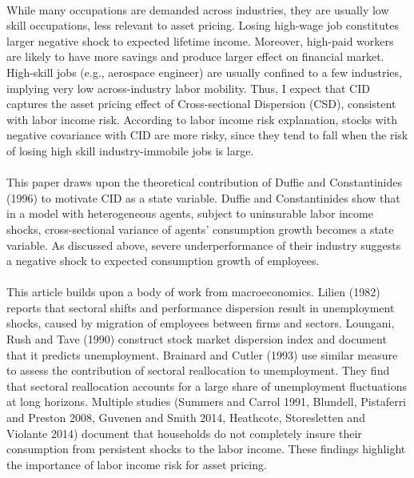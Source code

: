 \documentclass[12pt]{article}
\begin{document}
\paragraph{}
While many occupations are demanded across industries, they are usually low skill occupations, less relevant to asset pricing. Losing high-wage job constitutes larger negative shock to expected lifetime income. Moreover, high-paid workers are likely to have more savings and produce larger effect on financial market. High-skill jobs (e.g., aerospace engineer) are usually confined to a few industries, implying very low across-industry labor mobility. Thus, I expect that CID captures the asset pricing effect of Cross-sectional Dispersion (CSD), consistent with labor income risk. According to labor income risk explanation, stocks with negative covariance with CID are more risky, since they tend to fall when the risk of losing high skill industry-immobile jobs is large.
\paragraph{}
This paper draws upon the theoretical contribution of Duffie and Constantinides (1996) to motivate CID as a state variable. Duffie and Constantinides show that in a model with heterogeneous agents, subject to uninsurable labor income shocks, cross-sectional variance of agents' consumption growth becomes a state variable. As discussed above, severe underperformance of their industry suggests a negative shock to expected consumption growth of employees.
\paragraph{}
This article builds upon a body of work from macroeconomics. Lilien (1982) reports that sectoral shifts and performance dispersion result in unemployment shocks, caused by migration of employees between firms and sectors. Loungani, Rush and Tave (1990) construct stock market dispersion index and document that it predicts unemployment. Brainard and Cutler (1993) use similar measure to assess the contribution of sectoral reallocation to unemployment. They find that sectoral reallocation accounts for a large share of unemployment fluctuations at long horizons. Multiple studies (Summers and Carrol 1991, Blundell, Pistaferri and Preston 2008, Guvenen and Smith 2014, Heathcote, Storesletten and Violante 2014) document that households do not completely insure their consumption from persistent shocks to the labor income. These findings highlight the importance of labor income risk for asset pricing.
\end{document}
